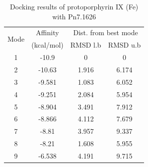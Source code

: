\documentclass[12pt]{article}
\begin{document}
	\begin{table}[h!]
		\centering
		\caption{\centering Docking results of protoporphyrin IX (Fe) with Pn7.1626}
		\label{table5p_1}
		\begin{tabular}{cccc}
			\toprule
			\multirow{2}{*}{Mode} & Affinity & \multicolumn{2}{c}{Dist. from best mode}\\
			&  (kcal/mol) & RMSD l.b & RMSD u.b\\
			\midrule
			1 &  -10.9   &       0   &       0\\
			2 & -10.63   &   1.916   &   6.174\\
			3 & -9.581   &   1.083   &   6.052\\
			4 & -9.251   &   2.084   &   5.954\\
			5 & -8.904   &   3.491   &   7.912\\
			6 & -8.866   &   4.112   &   7.679\\
			7 &  -8.81   &   3.957   &   9.337\\
			8 &  -8.21   &   1.608   &   5.955\\
			9 & -6.538   &   4.191   &   9.715\\
			\bottomrule
			
		\end{tabular}
	\end{table}
	
\end{document}

